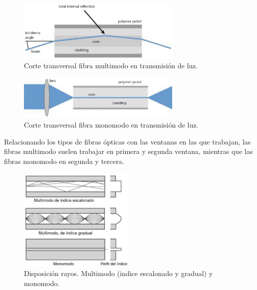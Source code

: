 \begin{itemize}
   	\begin{figure}[H]
		\centering
		\includegraphics[width=0.7\textwidth]{./img/guiaMM}
		\caption{Corte transversal fibra multimodo en transmisión de luz. \cite{imgMonoMulti} } 
		\label{fig:guiaMM}
	\end{figure} 
  	\begin{figure}[H]
		\centering
		\includegraphics[width=0.7\textwidth]{./img/guiaSM}
		\caption{Corte transversal fibra monomodo en transmisión de luz. \cite{imgMonoMulti} } 
		\label{fig:guiaSM}
	\end{figure}  
 	
 	Relacionando los tipos de fibras ópticas con las ventanas en las que trabajan, las fibras multimodo suelen trabajar en primera y segunda ventana, mientras que las fibras monomodo en segunda y tercera. 

	  	\begin{figure}[H]
		\centering
		\includegraphics[width=0.5\textwidth]{./img/transFO-esc-grad}
		\caption{Disposición rayos. Multimodo (indice escalonado y gradual) y monomodo. \cite{FOA} } 
		\label{fig:indiceMultimodo}
		\end{figure}
	

\end{itemize}
